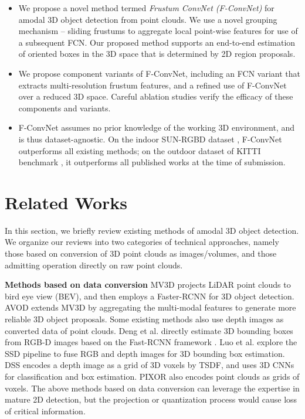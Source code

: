 \documentclass[letterpaper, 10 pt, conference]{ieeeconf}
\begin{document}
\begin{itemize}
	\item We propose a novel method termed \emph{Frustum ConvNet (F-ConvNet)} for amodal 3D object detection from point clouds. We use a novel grouping mechanism -- sliding frustums to aggregate local point-wise features for use of a subsequent FCN. Our proposed method supports an end-to-end estimation of oriented boxes in the 3D space that is determined by 2D region proposals.


	\item We propose component variants of F-ConvNet, including an FCN variant that extracts multi-resolution frustum features, and a refined use of F-ConvNet over a reduced 3D space. Careful ablation studies verify the efficacy of these components and variants.

	\item F-ConvNet assumes no prior knowledge of the working 3D environment, and is thus dataset-agnostic. On the indoor SUN-RGBD dataset \cite{song2015sun}, F-ConvNet outperforms all existing methods; on the outdoor dataset of KITTI benchmark \cite{geiger2012we}, it outperforms all published works at the time of submission.
\end{itemize}

\section{Related Works}
In this section, we briefly review existing methods of amodal 3D object detection. We organize our reviews into two categories of technical approaches, namely those based on conversion of 3D point clouds as images/volumes, and those admitting operation directly on raw point clouds.

\vspace{0.1cm}
\noindent\textbf{Methods based on data conversion} MV3D \cite{chen2017multi} projects LiDAR point clouds to bird eye view (BEV), and then employs a Faster-RCNN \cite{ren2015faster} for 3D object detection. AVOD \cite{ku2018joint} extends MV3D by aggregating the multi-modal features to generate more reliable 3D object proposals. Some existing methods also use depth images as converted data of point clouds. Deng et al. \cite{deng2017amodal} directly estimate 3D bounding boxes from RGB-D images based on the Fast-RCNN framework \cite{girshick2015fast}. Luo et al. \cite{luo2017single} explore the SSD pipeline \cite{liu2016ssd} to fuse RGB and depth images for 3D bounding box estimation. DSS \cite{song2016deep} encodes a depth image  as a grid of 3D voxels by TSDF, and uses 3D CNNs for classification and box estimation.  PIXOR \cite{yang2018pixor} also encodes point clouds as grids of voxels. The above methods based on data conversion can leverage the expertise in mature 2D detection, but the projection or quantization process would cause loss of critical information.
\end{document}
